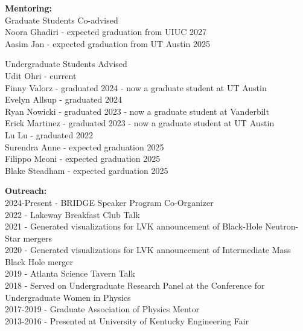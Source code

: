 \documentclass[11pt]{article}
\begin{document}
\begin{flushleft}
  \vspace{8px}
  
  \textbf{Mentoring:}\\
  Graduate Students Co-advised\\
  Noora Ghadiri - expected graduation from UIUC 2027\\
  Aasim Jan - expected graduation from UT Austin 2025\\
  
  \vspace{4px}
   
   Undergraduate Students Advised \\
   Udit Ohri - current\\
   Finny Valorz - graduated 2024 - now a graduate student at UT Austin\\   
   Evelyn Allsup - graduated 2024\\
   Ryan Nowicki - graduated 2023 - now a graduate student at Vanderbilt\\
   Erick Martinez - graduated 2023 - now a graduate student at UT Austin\\
   Lu Lu - graduated 2022\\
   Surendra Anne - expected graduation 2025\\
   Filippo Meoni - expected graduation 2025\\
   Blake Steadham - expected garduation 2025\\
    
 
  \vspace{8px}   
 
  \textbf{Outreach:}\\
  2024-Present - BRIDGE Speaker Program Co-Organizer\\ 
  2022 - Lakeway Breakfast Club Talk\\
  2021 - Generated visualizations for LVK announcement of Black-Hole Neutron-Star mergers\\
  2020 - Generated visualizations for LVK announcement of Intermediate Mass Black Hole merger\\
  2019 - Atlanta Science Tavern Talk\\
  2018 - Served on Undergraduate Research Panel at the Conference for Undergraduate Women in Physics\\
  2017-2019 - Graduate Association of Physics Mentor\\
  2013-2016 - Presented at University of Kentucky Engineering Fair\\

  \vspace{8px}


\end{flushleft}
\end{document}
